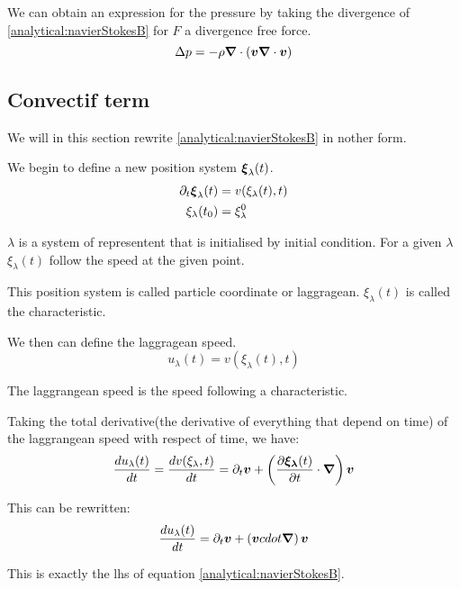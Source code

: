 We can obtain an expression for the pressure by taking the divergence of \ref{analytical:navierStokesB} for $F$ a divergence free force.
\begin{equation}
\label{analytical:pressure}
\Delta p=-\rho {\boldsymbol {\nabla}} \cdot ({\boldsymbol {v}}{\boldsymbol {\nabla}} \cdot {\boldsymbol {v}})
\end{equation}

\subsection{Convectif term}
\label{analytical:convectif}
We will in this section rewrite \ref{analytical:navierStokesB} in nother form.

We begin to define a new position system ${\boldsymbol {\xi}}_{\lambda}(t)$.
\begin{align}
 \partial_t {\boldsymbol {\xi}}_{\lambda}(t)&=v(\xi_{\lambda}(t),t)\\
 \xi_{\lambda}(t_0)&=\xi^{0}_{\lambda}
\end{align}

$\lambda$ is a system of representent that is initialised by initial condition.
For a given $\lambda$ $\xi_{\lambda}(t)$ follow the speed at the given point.

This position system is called particle coordinate or laggragean.
$\xi_\lambda(t)$ is called the characteristic.

We then can define the laggragean speed.
\begin{equation}
 u_{\lambda}(t)=v(\xi_{\lambda}(t),t)
\end{equation}

The laggrangean speed is the speed following a characteristic.

Taking the total derivative(the derivative of everything that depend on time) of the laggrangean speed with respect of time, we have:
\begin{equation}
\frac{d u_{\lambda}(t)}{d t}=\frac{d v(\xi_{\lambda},t)}{d t}=\partial_t {\boldsymbol {v}}+\left(\frac{\partial {\boldsymbol {\xi_{\lambda}}}(t)}{\partial t}\cdot{\boldsymbol {\nabla}}\right){\boldsymbol {v}}
\end{equation}

This can be rewritten:
\begin{equation}
\frac{d u_{\lambda}(t)}{d t}=\partial_t {\boldsymbol {v}}+\left({\boldsymbol {v}} cdot{\boldsymbol {\nabla}}\right){\boldsymbol {v}}
\end{equation}

This is exactly the lhs of equation \ref{analytical:navierStokesB}.

